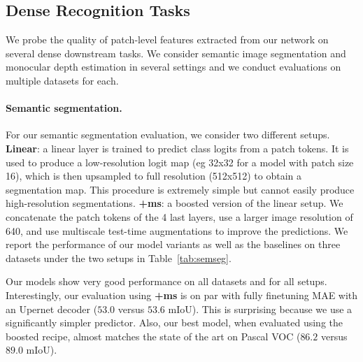 \subsection{Dense Recognition Tasks}
We probe the quality of patch-level features extracted from our network on several dense downstream tasks.
We consider semantic image segmentation and monocular depth estimation in several settings and we conduct evaluations on multiple datasets for each.

\paragraph{Semantic segmentation.}
For our semantic segmentation evaluation, we consider two different setups.
\textbf{Linear}: a linear layer is trained to predict class logits from a patch tokens. 
It is used to produce a low-resolution logit map (eg 32x32 for a model with patch size 16), which is then upsampled to full resolution (512x512) to obtain a segmentation map. 
This procedure is extremely simple but cannot easily produce high-resolution segmentations.
\textbf{+ms}: a boosted version of the linear setup. 
We concatenate the patch tokens of the 4 last layers, use a larger image  resolution of 640, and use multiscale test-time augmentations to improve the predictions. 
We report the performance of our model variants as well as the baselines on three datasets under the two setups in Table~\ref{tab:semseg}.

Our models show very good performance on all datasets and for all setups. 
Interestingly, our evaluation using \textbf{+ms} is on par with fully finetuning MAE with an Upernet decoder ($53.0$ versus $53.6$ mIoU).
This is surprising because we use a significantly simpler predictor.
Also, our best model, when evaluated using the boosted recipe, almost matches the state of the art on Pascal VOC ($86.2$ versus $89.0$ mIoU).




